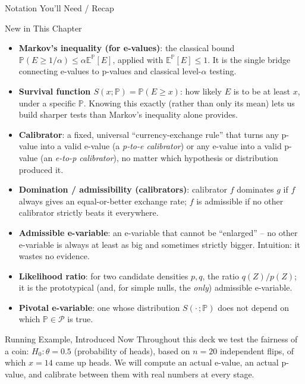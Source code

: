 \documentclass[aspectratio=169,10pt]{beamer}
\newcommand{\PP}{\mathbb{P}}
\newcommand{\EE}{\mathbb{E}}
\newcommand{\calP}{\mathcal{P}}
\begin{document}
\begin{frame}[allowframebreaks]{Notation You'll Need / Recap}
  \framebreak

  \begin{block}{New in This Chapter}
    \begin{itemize}
      \item \textbf{Markov's inequality (for e-values)}: the classical bound
        $\PP(E \ge 1/\alpha) \le \alpha \EE^\PP[E]$, applied with
        $\EE^\PP[E]\le 1$. It is the single bridge connecting e-values to
        p-values and classical level-$\alpha$ testing.
      \item \textbf{Survival function $S(x;\PP) = \PP(E \ge x)$}: how likely
        $E$ is to be at least $x$, under a specific $\PP$. Knowing this exactly
        (rather than only its mean) lets us build sharper tests than Markov's
        inequality alone provides.
      \item \textbf{Calibrator}: a fixed, universal ``currency-exchange rule''
        that turns any p-value into a valid e-value (a \emph{p-to-e calibrator})
        or any e-value into a valid p-value (an \emph{e-to-p calibrator}), no
        matter which hypothesis or distribution produced it.
      \item \textbf{Domination / admissibility (calibrators)}: calibrator $f$
        dominates $g$ if $f$ always gives an equal-or-better exchange rate;
        $f$ is admissible if no other calibrator strictly beats it everywhere.
      \item \textbf{Admissible e-variable}: an e-variable that cannot be
        ``enlarged'' -- no other e-variable is always at least as big and
        sometimes strictly bigger. Intuition: it wastes no evidence.
      \item \textbf{Likelihood ratio}: for two candidate densities $p, q$, the
        ratio $q(Z)/p(Z)$; it is the prototypical (and, for simple nulls, the
        \emph{only}) admissible e-variable.
      \item \textbf{Pivotal e-variable}: one whose distribution
        $S(\cdot\,;\PP)$ does not depend on which $\PP \in \calP$ is true.
    \end{itemize}
  \end{block}

  \framebreak

  \begin{alertblock}{Running Example, Introduced Now}
    Throughout this deck we test the fairness of a coin: $H_0: \theta = 0.5$
    (probability of heads), based on $n=20$ independent flips, of which
    $x=14$ came up heads. We will compute an actual e-value, an actual
    p-value, and calibrate between them with real numbers at every stage.
  \end{alertblock}

\end{frame}
\end{document}
